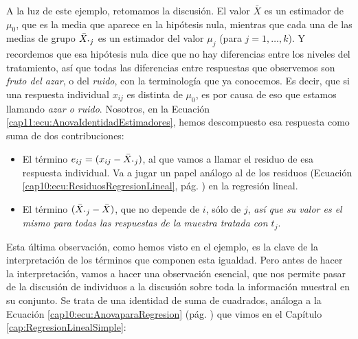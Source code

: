 A la luz de este ejemplo, retomamos la discusión. El valor $\bar X$ es un estimador de $\mu_0$, que es la media que aparece en la hipótesis nula, mientras que cada una de las medias de grupo $\bar X_{\mbox{\bf\large $\cdot$}j}$ es un estimador del valor $\mu_j$ (para $j=1,\ldots,k$). Y recordemos que esa hipótesis nula dice que no hay diferencias entre los niveles del tratamiento, así que todas las diferencias entre respuestas que observemos son {\em fruto del azar}, o del {\em ruido}, con la terminología que ya conocemos. Es decir, que si una respuesta individual $x_{ij}$ es distinta de $\mu_0$, es por causa de eso que estamos llamando {\em azar o ruido}. Nosotros, en la Ecuación \ref{cap11:ecu:AnovaIdentidadEstimadores}, hemos descompuesto esa respuesta como suma de dos contribuciones:
\begin{itemize}
  \item El término $e_{ij}=(x_{ij}-\bar X_{\mbox{\bf\large $\cdot$}j})$, al que vamos a llamar el {\sf residuo} de esa respuesta individual. Va a jugar un papel análogo al de los residuos (Ecuación \ref{cap10:ecu:ResiduosRegresionLineal}, pág. \pageref{cap10:ecu:ResiduosRegresionLineal}) en la regresión lineal.
  \item El término $(\bar X_{\mbox{\bf\large$\cdot$}j}-\bar X)$, que no depende de $i$, sólo de $j$, {\em así que su valor es el mismo para todas las respuestas de la muestra tratada con $t_j$}.
\end{itemize}
Esta última observación, como hemos visto en el ejemplo, es la clave de la interpretación de los términos que componen esta igualdad.  Pero antes de hacer la interpretación, vamos a hacer una observación esencial, que nos permite pasar de la discusión de individuos a la discusión sobre toda la información muestral en su conjunto. Se trata de una identidad de suma de cuadrados, análoga a la  Ecuación \ref{cap10:ecu:AnovaparaRegresion} (pág. \pageref{cap10:ecu:AnovaparaRegresion}) que vimos en el Capítulo \ref{cap:RegresionLinealSimple}:\\[1mm]

